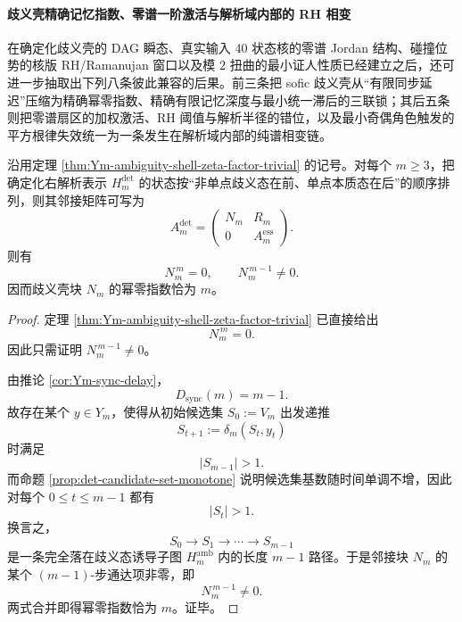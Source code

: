 \paragraph{歧义壳精确记忆指数、零谱一阶激活与解析域内部的 RH 相变}
在确定化歧义壳的 DAG 瞬态、真实输入 \(40\) 状态核的零谱 Jordan 结构、碰撞位势的核版 RH/Ramanujan 窗口以及模 \(2\) 扭曲的最小证人性质已经建立之后，还可进一步抽取出下列八条彼此兼容的后果。前三条把 sofic 歧义壳从“有限同步延迟”压缩为精确幂零指数、精确有限记忆深度与最小统一滞后的三联锁；其后五条则把零谱扇区的加权激活、RH 阈值与解析半径的错位，以及最小奇偶角色触发的平方根律失效统一为一条发生在解析域内部的纯谱相变链。

\begin{theorem}[歧义壳邻接块的精确幂零指数]\label{thm:xi-time-part9zm-ambiguity-shell-exact-nilpotent-index}
沿用定理 \ref{thm:Ym-ambiguity-shell-zeta-factor-trivial} 的记号。对每个 \(m\ge 3\)，把确定化右解析表示 \(H_m^{\mathrm{det}}\) 的状态按“非单点歧义态在前、单点本质态在后”的顺序排列，则其邻接矩阵可写为
\[
A_m^{\mathrm{det}}
=
\begin{pmatrix}
N_m & R_m\\
0 & A_m^{\mathrm{ess}}
\end{pmatrix}.
\]
则有
\[
N_m^{\,m}=0,
\qquad
N_m^{\,m-1}\neq 0.
\]
因而歧义壳块 \(N_m\) 的幂零指数恰为 \(m\)。
\end{theorem}
\begin{proof}
定理 \ref{thm:Ym-ambiguity-shell-zeta-factor-trivial} 已直接给出
\[
N_m^{\,m}=0.
\]
因此只需证明 \(N_m^{\,m-1}\neq 0\)。

由推论 \ref{cor:Ym-sync-delay}，
\[
D_{\mathrm{sync}}(m)=m-1.
\]
故存在某个 \(y\in Y_m\)，使得从初始候选集 \(S_0:=V_m\) 出发递推
\[
S_{t+1}:=\delta_m(S_t,y_t)
\]
时满足
\[
|S_{m-1}|>1.
\]
而命题 \ref{prop:det-candidate-set-monotone} 说明候选集基数随时间单调不增，因此对每个 \(0\le t\le m-1\) 都有
\[
|S_t|>1.
\]
换言之，
\[
S_0\to S_1\to\cdots\to S_{m-1}
\]
是一条完全落在歧义态诱导子图 \(H_m^{\mathrm{amb}}\) 内的长度 \(m-1\) 路径。于是邻接块 \(N_m\) 的某个 \((m-1)\)-步通达项非零，即
\[
N_m^{\,m-1}\neq 0.
\]
两式合并即得幂零指数恰为 \(m\)。证毕。
\end{proof}

